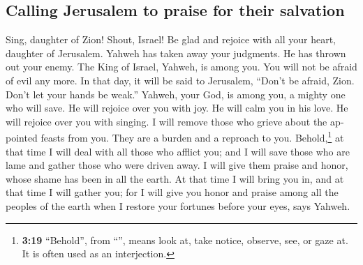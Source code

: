 \begin{paracol}{2}
\begin{otherlanguage}{english}
\hypertarget{calling-jerusalem-to-praise-for-their-salvation}{%
\subsection{Calling Jerusalem to praise for their
salvation}\label{calling-jerusalem-to-praise-for-their-salvation}}

 Sing, daughter of Zion! Shout, Israel! Be glad and
rejoice with all your heart, daughter of Jerusalem. 
Yahweh has taken away your judgments. He has thrown out your enemy. The
King of Israel, Yahweh, is among you. You will not be afraid of evil any
more.  In that day, it will be said to Jerusalem, ``Don't
be afraid, Zion. Don't let your hands be weak.''  Yahweh,
your God, is among you, a mighty one who will save. He will rejoice over
you with joy. He will calm you in his love. He will rejoice over you
with singing.  I will remove those who grieve about the
appointed feasts from you. They are a burden and a reproach to you.
 Behold,\footnote{\textbf{3:19} ``Behold'', from
  ``'', means look at, take notice, observe, see, or gaze
  at. It is often used as an interjection.} at that time I will deal
with all those who afflict you; and I will save those who are lame and
gather those who were driven away. I will give them praise and honor,
whose shame has been in all the earth.  At that time I
will bring you in, and at that time I will gather you; for I will give
you honor and praise among all the peoples of the earth when I restore
your fortunes before your eyes, says Yahweh.
\end{otherlanguage} \end{paracol}
